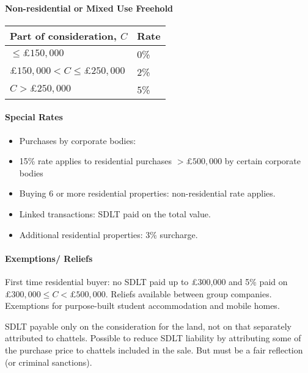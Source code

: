 \documentclass[
]{article}
\providecommand{\tightlist}{%
  \setlength{\itemsep}{0pt}\setlength{\parskip}{0pt}}
\begin{document}
\hypertarget{non-residential-or-mixed-use-freehold}{%
\paragraph{Non-residential or Mixed Use
Freehold}\label{non-residential-or-mixed-use-freehold}}

\begin{longtable}[]{@{}ll@{}}
\toprule()
Part of consideration, \(C\) & Rate \\
\midrule()
\endhead
\(\leq £150,000\) & 0\% \\
\(£150,000 < C \leq £250,000\) & 2\% \\
\(C > £250,000\) & 5\% \\
\bottomrule()
\end{longtable}

\hypertarget{special-rates}{%
\paragraph{Special Rates}\label{special-rates}}

\begin{itemize}
\tightlist
\item
  Purchases by corporate bodies:
\item
  15\% rate applies to residential purchases \(>£500,000\) by certain
  corporate bodies
\item
  Buying 6 or more residential properties: non-residential rate applies.
\item
  Linked transactions: SDLT paid on the total value.
\item
  Additional residential properties: 3\% surcharge.
\end{itemize}

\hypertarget{exemptions-reliefs}{%
\paragraph{Exemptions/ Reliefs}\label{exemptions-reliefs}}

First time residential buyer: no SDLT paid up to £300,000 and 5\% paid
on \(£300,000 \leq C < £500,000\). Reliefs available between group
companies. Exemptions for purpose-built student accommodation and mobile
homes.

SDLT payable only on the consideration for the land, not on that
separately attributed to chattels. Possible to reduce SDLT liability by
attributing some of the purchase price to chattels included in the sale.
But must be a fair reflection (or criminal sanctions).
\end{document}
